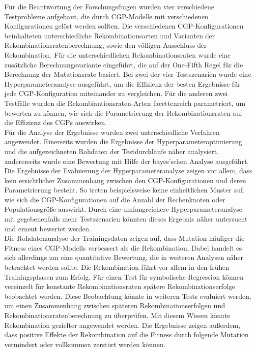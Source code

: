 Für die Beantwortung der Forschungsfragen wurden vier verschiedene Testprobleme aufgebaut, die durch CGP-Modelle mit verschiedenen Konfigurationen gelöst werden sollten.
Die verschiedenen CGP-Konfigurationen beinhalteten unterschiedliche Rekombinationsarten und Varianten der Rekombinationsratenberechnung, sowie den völligen Ausschluss der Rekombination.
Für die unterschiedlichen Rekombinationsraten wurde eine zusätzliche Berechnungsvariante eingeführt, die auf der One-Fifth Regel für die Berechnung der Mutationsrate basiert.
Bei zwei der vier Testszenarien wurde eine Hyperparameteranalyse ausgeführt, um die Effizienz der besten Ergebnisse für jede CGP-Konfiguration miteinander zu vergleichen.
Für die anderen zwei Testfälle wurden die Rekombiantionsraten-Arten facettenreich parametriert, um bewerten zu können, wie sich die Parametrierung der Rekombinationsraten auf die Effizienz des CGPs auswirken.\\
Für die Analyse der Ergebnisse wurden zwei unterschiedliche Verfahren angewendet.
Einerseits wurden die Ergebnisse der Hyperparameteroptimierung und die aufgezeichneten Rohdaten der Testdurchläufe näher analysiert, andererseits wurde eine Bewertung mit Hilfe der bayes'schen Analyse ausgeführt.\\
Die Ergebnisse der Evaluierung der Hyperparameteranalyse zeigen vor allem, dass kein ersichtlicher Zusammenhang zwischen den CGP-Konfigurationen und deren Parametrierung besteht.
So treten beispielsweise keine einheitlichen Muster auf, wie sich die CGP-Konfigurationen auf die Anzahl der Rechenknoten oder Populationsgröße auswirkt.
Durch eine umfangreichere Hyperparameteranalyse mit gegebenenfalls mehr Testszenarien könnten dieses Ergebnis näher untersucht und erneut bewertet werden.\\
Die Rohdatenanalyse der Trainingsdaten zeigen auf, dass Mutation häufiger die Fitness eines CGP-Modells verbessert als die Rekombination.
Dabei handelt es sich allerdings um eine quantitative Bewertung, die in weiteren Analysen näher betrachtet werden sollte.
Die Rekombination führt vor allem in den frühen Trainingsphasen zum Erfolg.
Für einen Test für symbolische Regression können vereinzelt für konstante Rekombinationsraten spätere Rekombinationserfolge beobachtet werden.
Diese Beobachtung könnte in weiteren Tests evaluiert werden, um einen Zusammenhang zwischen späteren Rekombinationserfolgen und Rekombinationsratenberechnung zu überprüfen.
Mit diesem Wissen könnte Rekombination gezielter angewendet werden.
Die Ergebnisse zeigen außerdem, dass positive Effekte der Rekombination auf die Fitness durch folgende Mutation vermindert oder vollkommen zerstört werden können.
